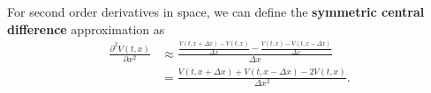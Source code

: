 For second order derivatives in space, we can define the \textbf{symmetric central difference} approximation as
\begin{align*}
 \frac{\partial^2 V(t,x)}{\partial x^2}  & \approx \frac{ \frac{V(t,x+\Delta x) - V(t,x)}{\Delta x} -  \frac{V(t,x) - V(t,x-\Delta x)}{\Delta x}}{\Delta x} \\
                         &= \frac{V(t,x+\Delta x) + V(t,x-\Delta x) - 2V(t,x)}{ \Delta x^2}. 
\end{align*}
% 

